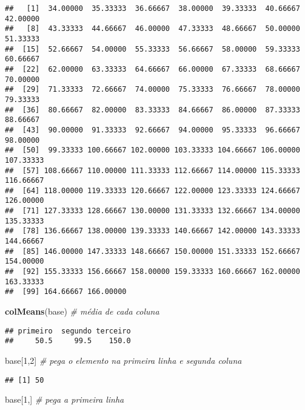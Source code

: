 \documentclass[]{article}
\newenvironment{Shaded}{\begin{snugshade}}{\end{snugshade}}
\newcommand{\CommentTok}[1]{\textcolor[rgb]{0.56,0.35,0.01}{\textit{#1}}}
\newcommand{\DecValTok}[1]{\textcolor[rgb]{0.00,0.00,0.81}{#1}}
\newcommand{\KeywordTok}[1]{\textcolor[rgb]{0.13,0.29,0.53}{\textbf{#1}}}
\newcommand{\NormalTok}[1]{#1}
\begin{document}
\begin{verbatim}
##   [1]  34.00000  35.33333  36.66667  38.00000  39.33333  40.66667  42.00000
##   [8]  43.33333  44.66667  46.00000  47.33333  48.66667  50.00000  51.33333
##  [15]  52.66667  54.00000  55.33333  56.66667  58.00000  59.33333  60.66667
##  [22]  62.00000  63.33333  64.66667  66.00000  67.33333  68.66667  70.00000
##  [29]  71.33333  72.66667  74.00000  75.33333  76.66667  78.00000  79.33333
##  [36]  80.66667  82.00000  83.33333  84.66667  86.00000  87.33333  88.66667
##  [43]  90.00000  91.33333  92.66667  94.00000  95.33333  96.66667  98.00000
##  [50]  99.33333 100.66667 102.00000 103.33333 104.66667 106.00000 107.33333
##  [57] 108.66667 110.00000 111.33333 112.66667 114.00000 115.33333 116.66667
##  [64] 118.00000 119.33333 120.66667 122.00000 123.33333 124.66667 126.00000
##  [71] 127.33333 128.66667 130.00000 131.33333 132.66667 134.00000 135.33333
##  [78] 136.66667 138.00000 139.33333 140.66667 142.00000 143.33333 144.66667
##  [85] 146.00000 147.33333 148.66667 150.00000 151.33333 152.66667 154.00000
##  [92] 155.33333 156.66667 158.00000 159.33333 160.66667 162.00000 163.33333
##  [99] 164.66667 166.00000
\end{verbatim}

\begin{Shaded}
\begin{Highlighting}[]
\KeywordTok{colMeans}\NormalTok{(base) }\CommentTok{# média de cada coluna}
\end{Highlighting}
\end{Shaded}

\begin{verbatim}
## primeiro  segundo terceiro 
##     50.5     99.5    150.0
\end{verbatim}

\begin{Shaded}
\begin{Highlighting}[]
\NormalTok{base[}\DecValTok{1}\NormalTok{,}\DecValTok{2}\NormalTok{] }\CommentTok{# pega o elemento na primeira linha e segunda coluna}
\end{Highlighting}
\end{Shaded}

\begin{verbatim}
## [1] 50
\end{verbatim}

\begin{Shaded}
\begin{Highlighting}[]
\NormalTok{base[}\DecValTok{1}\NormalTok{,] }\CommentTok{# pega a primeira linha}
\end{Highlighting}
\end{Shaded}
\end{document}
